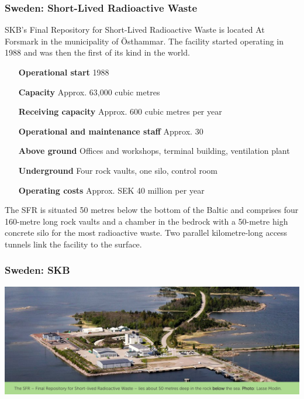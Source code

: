 \begin{frame}[c]
\frametitle{Sweden: Short-Lived Radioactive Waste}
SKB’s Final Repository for Short-Lived Radioactive Waste is located
At Forsmark in the municipality of \"{O}sthammar. The facility started operating in 1988 and was then the first of its kind in the world.

\begin{itemize}
\item[\textbf{Operational start}] 1988
\item[\textbf{Capacity}] Approx. 63,000 cubic metres
\item[\textbf{Receiving capacity}] Approx. 600 cubic metres per year
\item[\textbf{Operational and maintenance staff}] Approx. 30
\item[\textbf{Above ground}] Offices and workshops, terminal building, ventilation plant
\item[\textbf{Underground}] Four rock vaults, one silo, control room
\item[\textbf{Operating costs}] Approx. SEK 40 million per year
\end{itemize}

The SFR is situated 50 metres below the bottom of the Baltic and comprises four 160-metre long rock vaults and a chamber in the bedrock with a 50-metre high concrete silo for the most radioactive waste. Two parallel kilometre-long access tunnels link the facility to the surface.
\end{frame}
\begin{frame}[c]
\frametitle{Sweden: SKB}

\includegraphics[height=\textheight]{./images/sweden-sfr}

\end{frame}

